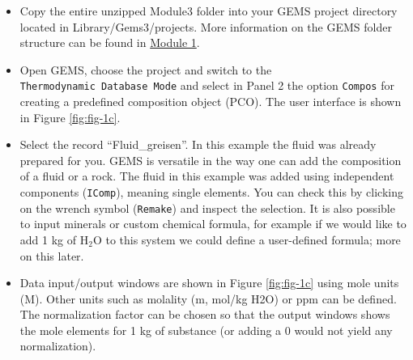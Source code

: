 \documentclass[
]{book}
\begin{document}
\begin{itemize}
\item
  Copy the entire unzipped Module3 folder into your GEMS project directory located in Library/Gems3/projects. More information on the GEMS folder structure can be found in \protect\hyperlink{intro}{Module 1}.
\item
  Open GEMS, choose the project and switch to the \texttt{Thermodynamic\ Database\ Mode} and select in Panel 2 the option \texttt{Compos} for creating a predefined composition object (PCO). The user interface is shown in Figure \ref{fig:fig-1c}.
\item
  Select the record ``Fluid\_greisen''. In this example the fluid was already prepared for you. GEMS is versatile in the way one can add the composition of a fluid or a rock. The fluid in this example was added using independent components (\texttt{IComp}), meaning single elements. You can check this by clicking on the wrench symbol (\texttt{Remake}) and inspect the selection. It is also possible to input minerals or custom chemical formula, for example if we would like to add 1 kg of H\(_{2}\)O to this system we could define a user-defined formula; more on this later.
\item
  Data input/output windows are shown in Figure \ref{fig:fig-1c} using mole units (M). Other units such as molality (m, mol/kg H2O) or ppm can be defined. The normalization factor can be chosen so that the output windows shows the mole elements for 1 kg of substance (or adding a 0 would not yield any normalization).
\end{itemize}
\end{document}
